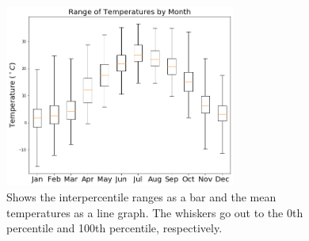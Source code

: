 \documentclass[11pt]{report}
\begin{document}
\begin{figure}[b]
	\centering
	\includegraphics[width=0.675\textwidth]{Figures/Temp_range.png}
	\caption[Temperature range for Princeton
          (2017--2021)]{\label{Temp_range} Shows the interpercentile ranges
          as a bar and the mean temperatures as a line graph. The whiskers
          go out to the 0th percentile and 100th percentile, respectively.}
\end{figure}
\clearpage

\clearpage
\end{document}

